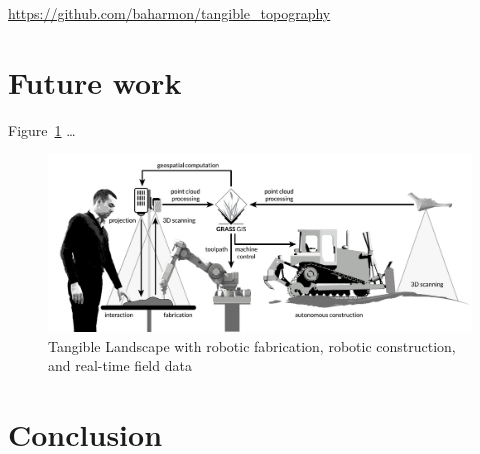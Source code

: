 \documentclass[prodmode,acmtochi]{acmsmall} %
\begin{document}
\url{https://github.com/baharmon/tangible_topography}

\section{Future work}






Figure~\ref{fig:system_schema_land} \ldots 

\begin{figure}%
\begin{center}
\includegraphics[width=\textwidth]{images/system_schema_land.pdf}
\caption{Tangible Landscape with robotic fabrication, robotic construction, and real-time field data}
\label{fig:system_schema_land}
\end{center}
\end{figure}

\section{Conclusion}

\end{document}
